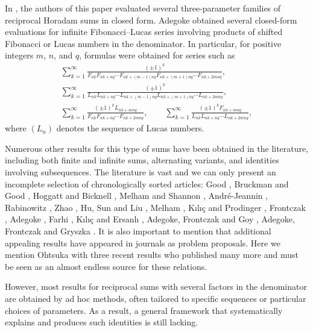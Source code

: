 \documentclass[12pt,reqno]{article}
\begin{document}
In \cite{AFG1}, the authors of this paper evaluated several three-parameter families of reciprocal Horadam sums in closed form. Adegoke \cite{Adegoke} obtained several closed-form evaluations for infinite Fibonacci--Lucas series involving products of shifted Fibonacci or Lucas numbers in the denominator. In particular, for positive integers $m$, $n$, and $q$, formulas were obtained for series such as
	\begin{gather*}
	\sum_{k=1}^{\infty}
	\frac{(\pm1)^k}{F_{nk} F_{nk+nq} \cdots F_{nk+(m-1)nq} F_{nk+(m+1)nq} \cdots F_{nk+2mnq}},\\
	\sum_{k=1}^{\infty}
	\frac{(\pm1)^k}{L_{nk} L_{nk+nq} \cdots L_{nk+(m-1)nq} L_{nk+(m+1)nq} \cdots L_{nk+2mnq}},\\
	\sum_{k=1}^{\infty}
	\frac{(\pm1)^k L_{nk+mnq}}{F_{nk} F_{nk+nq} \cdots F_{nk+2mnq}},\qquad \sum_{k=1}^{\infty}
	\frac{(\pm1)^k F_{nk+mnq}}{L_{nk} L_{nk+nq} \cdots L_{nk+2mnq}}, 
	\end{gather*}
where $(L_n)$ denotes the sequence of Lucas numbers.

Numerous other results for this type of sums have been obtained in the literature, including both finite and infinite sums, alternating variants, and identities involving subsequences. The literature is vast and we can only present an incomplete selection of chronologically sorted articles: Good \cite{Good}, Bruckman and Good \cite{Bruckman}, Hoggatt and Bicknell \cite{Hoggatt1,Hoggatt2}, Melham and Shannon \cite{Melham-Shannon}, Andr\'{e}-Jeannin \cite{A-Jeannin}, Rabinowitz \cite{Rabinowitz1,Rabinowitz2}, Zhao \cite{Zhao}, Hu, Sun and Liu \cite{Hu}, Melham \cite{Melham2000,Melham2001,Melham2002,Melham2012,Melham2013,Melham2014a,Melham2014b,Melham2015a,Melham2015b}, K\i l\i \c c and Prodinger \cite{Kilic1}, Frontczak \cite{Frontczak2,Frontczak1}, Adegoke \cite{Adegoke}, Farhi \cite{Farhi}, K\i l\i \c c and Ersanl\i{} \cite{Kilic2}, Adegoke, Frontczak and Goy \cite{AFG-Tatra,AFG1},
Adegoke, Frontczak and Gryszka \cite{AFG2}.
It is also important to mention that additional appealing results have appeared in journals as problem proposals. Here we mention Ohtsuka with three recent results \cite{Ohtsuka1,Ohtsuka2,Ohtsuka3} who published many more and must be seen as an almost endless source for these relations.

However, most results for reciprocal sums with several factors in the denominator are obtained by ad hoc methods, often tailored to specific sequences or particular choices of parameters. As a result, a general framework that systematically explains and produces such identities is still lacking.
\end{document}
